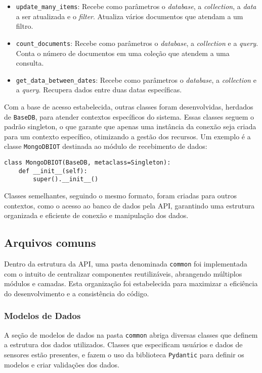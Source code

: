 \begin{itemize}
    \item \texttt{update\_many\_items}: Recebe como parâmetros o \textit{database}, a \textit{collection}, a \textit{data} a ser atualizada e o \textit{filter}. Atualiza vários documentos que atendam a um filtro.
    
    \item \texttt{count\_documents}: Recebe como parâmetros o \textit{database}, a \textit{collection} e a \textit{query}. Conta o número de documentos em uma coleção que atendem a uma consulta.
    
    \item \texttt{get\_data\_between\_dates}: Recebe como parâmetros o \textit{database}, a \textit{collection} e a \textit{query}. Recupera dados entre duas datas específicas.
\end{itemize}


Com a base de acesso estabelecida, outras classes foram desenvolvidas, herdados de \texttt{BaseDB}, para atender contextos específicos do sistema. Essas classes seguem o padrão singleton, o que garante que apenas uma instância da conexão seja criada para um contexto específico, otimizando a gestão dos recursos. Um exemplo é a classe \texttt{MongoDBIOT} destinada ao módulo de recebimento de dados:

\begin{verbatim}
class MongoDBIOT(BaseDB, metaclass=Singleton):
    def __init__(self):
        super().__init__()
\end{verbatim}

Classes semelhantes, seguindo o mesmo formato, foram criadas para outros contextos, como o acesso ao banco de dados pela \gls{API}, garantindo uma estrutura organizada e eficiente de conexão e manipulação dos dados.

\subsection{Arquivos comuns}\label{subsec:commum}

Dentro da estrutura da \gls{API}, uma pasta denominada \texttt{common} foi implementada com o intuito de centralizar componentes reutilizáveis, abrangendo múltiplos módulos e camadas. Esta organização foi estabelecida para maximizar a eficiência do desenvolvimento e a consistência do código.

\subsubsection{Modelos de Dados}\label{subsubsec:dataModel}
A seção de modelos de dados na pasta \texttt{common} abriga diversas classes que definem a estrutura dos dados utilizados. Classes que especificam usuários e dados de sensores estão presentes, e fazem o uso da biblioteca \texttt{Pydantic} para definir os modelos e criar validações dos dados.

